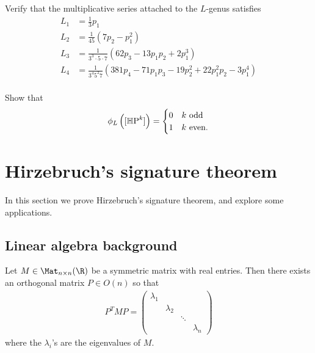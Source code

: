 \documentclass[11pt]{book}
\begin{document}
\begin{exercise}\label{exer:m-series-for-L-genus} 
Verify that the multiplicative series attached to the $L$-genus satisfies
\begin{align*}
    L_1 &= \frac{1}{3}p_1 \\
    L_2 &= \frac{1}{45}(7p_2-p_1^2) \\
    L_3 &= \frac{1}{3^3\cdot5\cdot 7} (62p_3 - 13p_1p_2 + 2p_1^3) \\
    L_4 &= \frac{1}{3^4 5^2 7} (381 p_4 - 71 p_1 p_3 - 19 p_2^2 + 22p_1^2 p_2 -3 p_1^4) \\
\end{align*}
\end{exercise}

\begin{exercise} Show that
\begin{align*}
    \phi_L \left( [{\mathbb{H}\text{P}}^k] \right) = \begin{cases} 0 & k\text{ odd} \\ 1 & k\text{ even.} \end{cases}
\end{align*}
\end{exercise}


\section{Hirzebruch's signature theorem}

In this section we prove Hirzebruch's signature theorem, and explore some applications.

\subsection{Linear algebra background}

\begin{theorem} Let $M\in \Mat_{n \times n}(\R)$ be a symmetric matrix with real entries. Then there exists an orthogonal matrix $P \in O(n)$ so that
\begin{align*}
    P^T M P = \begin{pmatrix} \lambda_1 \\ & \lambda_2 & \\
    & & \ddots  \\
    & & & \lambda_n\end{pmatrix} 
\end{align*}
where the $\lambda_i$'s are the eigenvalues of $M$.
\end{theorem}
\end{document}
